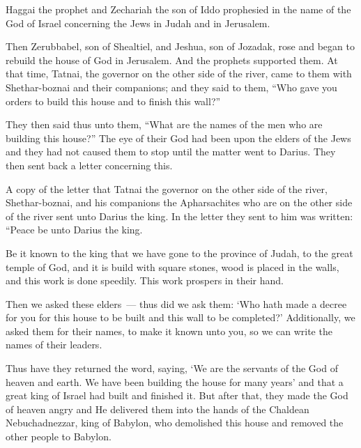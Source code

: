 
\begin{inparaenum}
   Haggai the prophet and Zechariah the son of Iddo prophesied in the name of the God of Israel concerning the Jews in Judah and in Jerusalem.%

   Then Zerubbabel, son of Shealtiel, and Jeshua, son of Jozadak, rose and began to rebuild the house of God in Jerusalem. And the prophets supported them.%
   At that time, Tatnai, the governor on the other side of the river, came to them with Shethar-boznai and their companions; and they said to them, ``Who gave you orders to build this house and to finish this wall?''%

   They then said thus unto them, ``What are the names of the men who are building this house?''%
   The eye of their God had been upon the elders of the Jews and they had not caused them to stop until the matter went to Darius. They then sent back a letter concerning this.%

   A copy of the letter that Tatnai the governor on the other side of the river, Shethar-boznai, and his companions the Apharsachites who are on the other side of the river sent unto Darius the king.%
   In the letter they sent to him was written: ``Peace be unto Darius the king.%

   Be it known to the king that we have gone to the province of Judah, to the great temple of God, and it is build with square stones, wood is placed in the walls, and this work is done speedily. This work prospers in their hand.%

   Then we asked these elders~--- thus did we ask them: `Who hath made a decree for you for this house to be built and this wall to be completed?'%
   Additionally, we asked them for their names, to make it known unto you, so we can write the names of their leaders.%

   Thus have they returned the word, saying, `We are the servants of the God of heaven and earth. We have been building the house for many years' and that a great king of Israel had built and finished it.%
   But after that, they made the God of heaven angry and He delivered them into the hands of the Chaldean Nebuchadnezzar, king of Babylon, who demolished this house and removed the other people to Babylon.%


\end{inparaenum}
